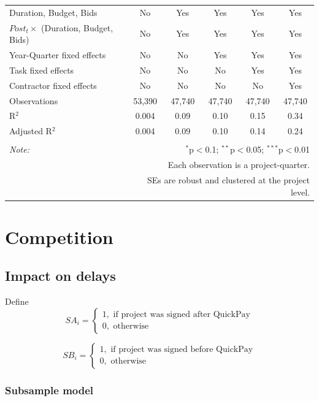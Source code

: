 \documentclass[
]{article}
\begin{document}
\begin{table}[H]
\begin{tabular}{@{\extracolsep{-2pt}}lccccc}
Duration, Budget, Bids & No & Yes & Yes & Yes & Yes \\ 
$Post_t \times $  (Duration, Budget, Bids) & No & Yes & Yes & Yes & Yes \\ 
Year-Quarter fixed effects & No & No & Yes & Yes & Yes \\ 
Task fixed effects & No & No & No & Yes & Yes \\ 
Contractor fixed effects & No & No & No & No & Yes \\ 
Observations & 53,390 & 47,740 & 47,740 & 47,740 & 47,740 \\ 
R$^{2}$ & 0.004 & 0.09 & 0.10 & 0.15 & 0.34 \\ 
Adjusted R$^{2}$ & 0.004 & 0.09 & 0.10 & 0.14 & 0.24 \\ 
\hline 
\hline \\[-1.8ex] 
\textit{Note:}  & \multicolumn{5}{r}{$^{*}$p$<$0.1; $^{**}$p$<$0.05; $^{***}$p$<$0.01} \\ 
 & \multicolumn{5}{r}{Each observation is a project-quarter.} \\ 
 & \multicolumn{5}{r}{SEs are robust and clustered at the project level.} \\ 
\end{tabular} 
\end{table}

\hypertarget{competition}{%
\section{Competition}\label{competition}}

\hypertarget{impact-on-delays}{%
\subsection{Impact on delays}\label{impact-on-delays}}

Define
\[ SA_i = \begin{cases} 1, \text{ if project was signed after QuickPay}\\
0, \text{ otherwise} \end{cases}\]

\[ SB_i = \begin{cases} 1, \text{ if project was signed before QuickPay}\\
0, \text{ otherwise} \end{cases}\]

\hypertarget{subsample-model}{%
\subsubsection{Subsample model}\label{subsample-model}}
\end{document}
